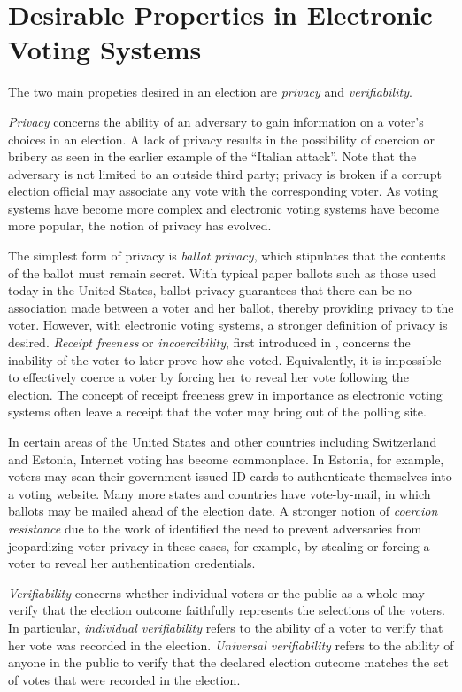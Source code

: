 \section{Desirable Properties in Electronic Voting Systems} \label{intro:props}

The two main propeties desired in an election are \emph{privacy} and \emph{verifiability}.

\emph{Privacy} concerns the ability of an adversary to gain information on a voter's choices in an election. A lack of privacy results in the possibility of coercion or bribery as seen in the earlier example of the ``Italian attack''. Note that the adversary is not limited to an outside third party; privacy is broken if a corrupt election official may associate any vote with the corresponding voter. As voting systems have become more complex and electronic voting systems have become more popular, the notion of privacy has evolved.

The simplest form of privacy is \emph{ballot privacy}, which stipulates that the contents of the ballot must remain secret. With typical paper ballots such as those used today in the United States, ballot privacy guarantees that there can be no association made between a voter and her ballot, thereby providing privacy to the voter. However, with electronic voting systems, a stronger definition of privacy is desired. \emph{Receipt freeness} or \emph{incoercibility}, first introduced in \cite{bt94}, concerns the inability of the voter to later prove how she voted. Equivalently, it is impossible to effectively coerce a voter by forcing her to reveal her vote following the election. The concept of receipt freeness grew in importance as electronic voting systems often leave a receipt that the voter may bring out of the polling site.

In certain areas of the United States and other countries including Switzerland and Estonia, Internet voting has become commonplace. In Estonia, for example, voters may scan their government issued ID cards to authenticate themselves into a voting website. Many more states and countries have vote-by-mail, in which ballots may be mailed ahead of the election date. A stronger notion of \emph{coercion resistance} due to the work of \cite{jcj05} identified the need to prevent adversaries from jeopardizing voter privacy in these cases, for example, by stealing or forcing a voter to reveal her authentication credentials.

\emph{Verifiability} concerns whether individual voters or the public as a whole may verify that the election outcome faithfully represents the selections of the voters. In particular, \emph{individual verifiability} refers to the ability of a voter to verify that her vote was recorded in the election. \emph{Universal verifiability} refers to the ability of anyone in the public to verify that the declared election outcome matches the set of votes that were recorded in the election.

